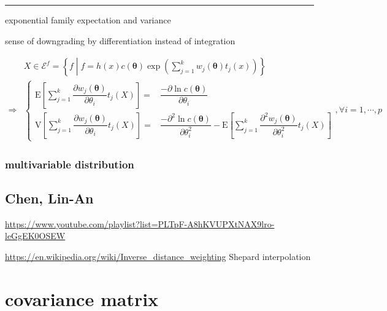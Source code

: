 \documentclass[
]{book}
\theoremstyle{definition}
\theoremstyle{definition}
\theoremstyle{definition}
\theoremstyle{definition}
\theoremstyle{remark}
\begin{document}
\begin{center}\rule{0.5\linewidth}{0.5pt}\end{center}

exponential family expectation and variance

sense of downgrading by differentiation instead of integration

\[
\begin{aligned}
 & X\in\mathcal{E}^{f}=\left\{ f\middle|f=h\left(x\right)c\left(\boldsymbol{\theta}\right)\exp\left(\sum\limits _{j=1}^{k}w_{{\scriptscriptstyle j}}\left(\boldsymbol{\theta}\right)t_{{\scriptscriptstyle j}}\left(x\right)\right)\right\} \\
\Rightarrow & \begin{cases}
\mathrm{E}\left[\sum\limits _{j=1}^{k}\dfrac{\partial w_{{\scriptscriptstyle j}}\left(\boldsymbol{\theta}\right)}{\partial\theta_{{\scriptscriptstyle i}}}t_{{\scriptscriptstyle j}}\left(X\right)\right]= & \dfrac{-\partial\ln c\left(\boldsymbol{\theta}\right)}{\partial\theta_{{\scriptscriptstyle i}}}\\
\mathrm{V}\left[\sum\limits _{j=1}^{k}\dfrac{\partial w_{{\scriptscriptstyle j}}\left(\boldsymbol{\theta}\right)}{\partial\theta_{{\scriptscriptstyle i}}}t_{{\scriptscriptstyle j}}\left(X\right)\right]= & \dfrac{-\partial^{2}\ln c\left(\boldsymbol{\theta}\right)}{\partial\theta_{{\scriptscriptstyle i}}^{2}}-\mathrm{E}\left[\sum\limits _{j=1}^{k}\dfrac{\partial^{2}w_{{\scriptscriptstyle j}}\left(\boldsymbol{\theta}\right)}{\partial\theta_{{\scriptscriptstyle i}}^{2}}t_{{\scriptscriptstyle j}}\left(X\right)\right]
\end{cases},\forall i=1,\cdots,p
\end{aligned}
\]

\subsection{multivariable distribution}\label{multivariable-distribution}

\section{Chen, Lin-An}\label{chen-lin-an}

\url{https://www.youtube.com/playlist?list=PLTpF-A8hKVUPXtNAX9lro-leGgEK0OSEW}

\url{https://en.wikipedia.org/wiki/Inverse_distance_weighting} Shepard interpolation

\chapter{covariance matrix}\label{covariance-matrix}
\end{document}
